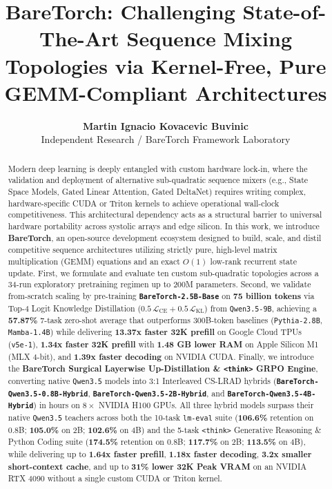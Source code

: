 \documentclass[twocolumn,10pt]{article}
\title{\textbf{BareTorch: Challenging State-of-The-Art Sequence Mixing Topologies via Kernel-Free, Pure GEMM-Compliant Architectures}}
\author{\textbf{Martin Ignacio Kovacevic Buvinic}\\Independent Research / BareTorch Framework Laboratory}
\date{}
\begin{document}
\maketitle

\begin{abstract}
Modern deep learning is deeply entangled with custom hardware lock-in, where the validation and deployment of alternative sub-quadratic sequence mixers (e.g., State Space Models, Gated Linear Attention, Gated DeltaNet) requires writing complex, hardware-specific CUDA or Triton kernels to achieve operational wall-clock competitiveness. This architectural dependency acts as a structural barrier to universal hardware portability across systolic arrays and edge silicon. In this work, we introduce \textbf{BareTorch}, an open-source development ecosystem designed to build, scale, and distil competitive sequence architectures utilizing strictly pure, high-level matrix multiplication (GEMM) equations and an exact $O(1)$ low-rank recurrent state update. First, we formulate and evaluate ten custom sub-quadratic topologies across a 34-run exploratory pretraining regimen up to 200M parameters. Second, we validate from-scratch scaling by pre-training \textbf{\texttt{BareTorch-2.5B-Base}} on \textbf{75 billion tokens} via Top-4 Logit Knowledge Distillation ($0.5\,\mathcal{L}_{\text{CE}} + 0.5\,\mathcal{L}_{\text{KL}}$) from \texttt{Qwen3.5-9B}, achieving a \textbf{57.87\%} 7-task zero-shot average that outperforms 300B-token baselines (\texttt{Pythia-2.8B}, \texttt{Mamba-1.4B}) while delivering \textbf{13.37x faster 32K prefill} on Google Cloud TPUs (\texttt{v5e-1}), \textbf{1.34x faster 32K prefill} with \textbf{1.48 GB lower RAM} on Apple Silicon M1 (MLX 4-bit), and \textbf{1.39x faster decoding} on NVIDIA CUDA. Finally, we introduce the \textbf{BareTorch Surgical Layerwise Up-Distillation \& \texttt{<think>} GRPO Engine}, converting native \texttt{Qwen3.5} models into 3:1 Interleaved CS-LRAD hybrids (\textbf{\texttt{BareTorch-Qwen3.5-0.8B-Hybrid}}, \textbf{\texttt{BareTorch-Qwen3.5-2B-Hybrid}}, and \textbf{\texttt{BareTorch-Qwen3.5-4B-Hybrid}}) in hours on $8\times$ NVIDIA H100 GPUs. All three hybrid models surpass their native \texttt{Qwen3.5} teachers across both the 10-task \texttt{lm-eval} suite (\textbf{106.6\%} retention on 0.8B; \textbf{105.0\%} on 2B; \textbf{102.6\%} on 4B) and the 5-task \texttt{<think>} Generative Reasoning \& Python Coding suite (\textbf{174.5\%} retention on 0.8B; \textbf{117.7\%} on 2B; \textbf{113.5\%} on 4B), while delivering up to \textbf{1.64x faster prefill}, \textbf{1.18x faster decoding}, \textbf{3.2x smaller short-context cache}, and up to \textbf{31\% lower 32K Peak VRAM} on an NVIDIA RTX 4090 without a single custom CUDA or Triton kernel.
\end{abstract}
\end{document}
